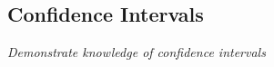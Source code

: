 \subsection[confidence intervals]{Confidence Intervals}

\textit{Demonstrate knowledge of confidence intervals}

\vspace{.5cm}